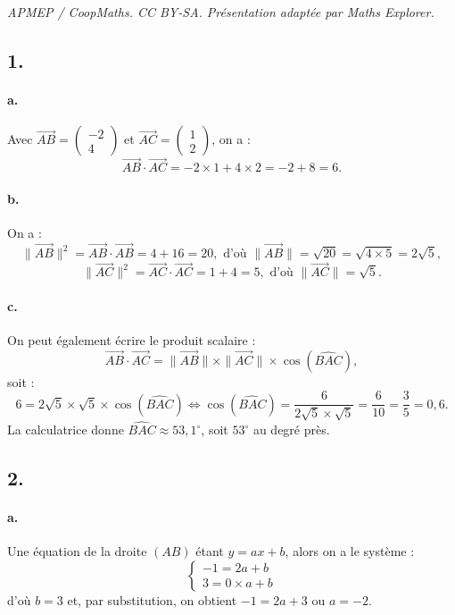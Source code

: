 \documentclass[10pt]{article}
\begin{document}
\noindent\textit{APMEP / CoopMaths. CC BY-SA. Présentation adaptée par Maths Explorer.}\par\medskip
\subsection*{1.}

\paragraph{a.} Avec \(\overrightarrow{AB} = \begin{pmatrix} -2 \\ 4 \end{pmatrix}\) et \(\overrightarrow{AC} = \begin{pmatrix} 1 \\ 2 \end{pmatrix}\), on a :
\[
\overrightarrow{AB} \cdot \overrightarrow{AC} = -2 \times 1 + 4 \times 2 = -2 + 8 = 6.
\]

\paragraph{b.} On a :
\[
\|\overrightarrow{AB}\|^2 = \overrightarrow{AB} \cdot \overrightarrow{AB} = 4 + 16 = 20, \text{ d'où } \|\overrightarrow{AB}\| = \sqrt{20} = \sqrt{4 \times 5} = 2 \sqrt{5},
\]
\[
\|\overrightarrow{AC}\|^2 = \overrightarrow{AC} \cdot \overrightarrow{AC} = 1 + 4 = 5, \text{ d'où } \|\overrightarrow{AC}\| = \sqrt{5}.
\]

\paragraph{c.} On peut également écrire le produit scalaire :
\[
\overrightarrow{AB} \cdot \overrightarrow{AC} = \|\overrightarrow{AB}\| \times \|\overrightarrow{AC}\| \times \cos(\widehat{BAC}),
\]
soit :
\[
6 = 2 \sqrt{5} \times \sqrt{5} \times \cos(\widehat{BAC}) \iff \cos(\widehat{BAC}) = \dfrac{6}{2 \sqrt{5} \times \sqrt{5}} = \dfrac{6}{10} = \dfrac{3}{5} = 0{,}6.
\]
La calculatrice donne \(\widehat{BAC} \approx 53{,}1^\circ\), soit \(53^\circ\) au degré près.

\subsection*{2.}

\paragraph{a.} Une équation de la droite \((AB)\) étant \(y = ax + b\), alors on a le système :
\[
\begin{cases} 
-1 = 2a + b \\ 
3 = 0 \times a + b 
\end{cases}
\]
d'où \(b = 3\) et, par substitution, on obtient \(-1 = 2a + 3\) ou \(a = -2\).
\end{document}
